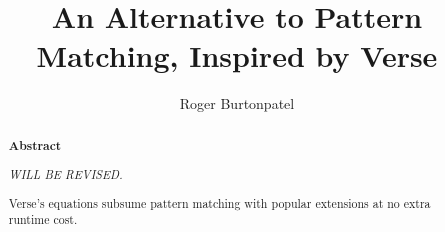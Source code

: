 \documentclass[manuscript,screen,review, 12pt, nonacm]{acmart}
\begin{document}
\title{An Alternative to Pattern Matching, Inspired by Verse}

\author{Roger Burtonpatel}



\renewcommand{\shortauthors}{Burtonpatel et al.}

\begin{abstract}
    \bf{Abstract}

    \it{WILL BE REVISED.}
  

Verse's equations subsume pattern matching with popular extensions at no extra
runtime cost.
  \end{abstract}
\end{document}
